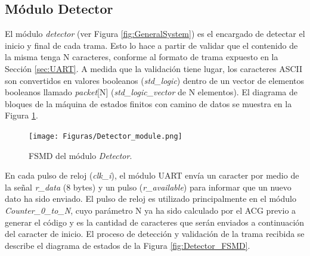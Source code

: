 \subsection{Módulo Detector}
	\label{sec:detector}
	
	El módulo \textit{detector} (ver Figura \ref{fig:GeneralSystem}) es el encargado de detectar el inicio y final de cada trama. Esto lo hace a partir de validar que el contenido de la misma tenga N caracteres, conforme al formato de trama expuesto en la Sección \ref{sec:UART}. A medida que la validación tiene lugar, los caracteres ASCII son convertidos en valores booleanos (\textit{std\_logic}) dentro de un vector de elementos booleanos llamado \textit{packet}[N] (\textit{std\_logic\_vector} de N elementos). El diagrama de bloques de la máquina de estados finitos con camino de datos se muestra en la Figura \ref{fig:Detector_module}.
	
	\begin{figure}[H]
		\centering
		\texttt{[image: Figuras/Detector\_module.png]}
		\centering\caption{FSMD del módulo \textit{Detector}.}
		\label{fig:Detector_module}
	\end{figure}
	
	En cada pulso de reloj (\textit{clk\_i}), el módulo UART envía un caracter por medio de la señal \textit{r\_data} (8 bytes) y un pulso (\textit{r\_available}) para informar que un nuevo dato ha sido enviado. El pulso de reloj es utilizado principalmente en el módulo \textit{Counter\_0\_to\_N}, cuyo parámetro N ya ha sido calculado por el ACG previo a generar el código y es la cantidad de caracteres que serán enviados a continuación del caracter de inicio. El proceso de detección y validación de la trama recibida se describe el diagrama de estados de la Figura \ref{fig:Detector_FSMD}.
	
